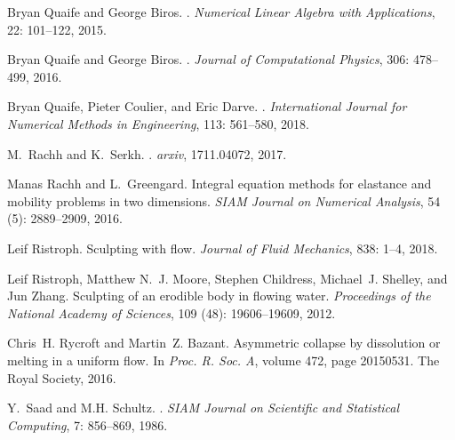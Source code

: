 \documentclass[preprint, 10pt]{elsarticle}
\begin{document}
\begin{thebibliography}{72}
Bryan Quaife and George Biros.
.
\newblock \emph{Numerical Linear Algebra with Applications}, 22:
  101--122, 2015.

Bryan Quaife and George Biros.
.
\newblock \emph{Journal of Computational Physics}, 306: 478--499,
  2016.

Bryan Quaife, Pieter Coulier, and Eric Darve.
.
\newblock \emph{International Journal for Numerical Methods in Engineering},
  113: 561--580, 2018.

M.~Rachh and K.~Serkh.
.
\newblock \emph{arxiv}, 1711.04072, 2017.

Manas Rachh and L.~Greengard.
\newblock Integral equation methods for elastance and mobility problems in two
  dimensions.
\newblock \emph{SIAM Journal on Numerical Analysis}, 54 (5):
  2889--2909, 2016.

Leif Ristroph.
\newblock Sculpting with flow.
\newblock \emph{Journal of Fluid Mechanics}, 838: 1--4, 2018.

Leif Ristroph, Matthew N.~J. Moore, Stephen Childress, Michael~J. Shelley, and
  Jun Zhang.
\newblock Sculpting of an erodible body in flowing water.
\newblock \emph{Proceedings of the National Academy of Sciences}, 109
  (48): 19606--19609, 2012.

Chris~H. Rycroft and Martin~Z. Bazant.
\newblock Asymmetric collapse by dissolution or melting in a uniform flow.
\newblock In \emph{Proc. R. Soc. A}, volume 472, page 20150531. The Royal
  Society, 2016.

Y.~Saad and M.H. Schultz.
.
\newblock \emph{SIAM Journal on Scientific and Statistical Computing},
  7: 856--869, 1986.


\end{thebibliography}
\end{document}
